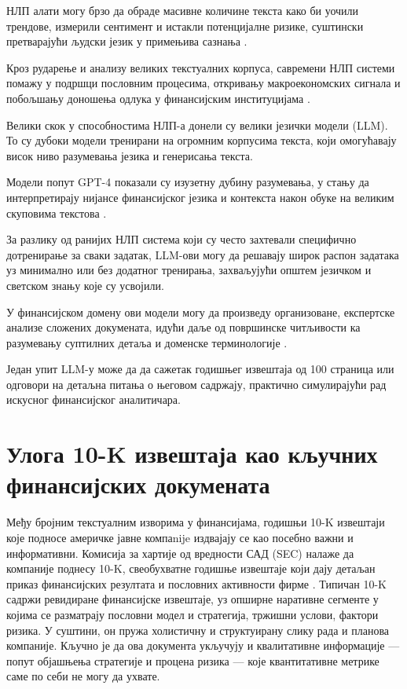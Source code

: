 НЛП алати могу брзо да обраде масивне количине текста како би уочили трендове, измерили сентимент и истакли потенцијалне ризике, суштински претварајући људски језик у примењива сазнања \cite{paro_ai_strategic_2023}. 

Кроз рударење и анализу великих текстуалних корпуса, савремени НЛП системи помажу у подршци пословним процесима, откривању макроекономских сигнала и побољшању доношења одлука у финансијским институцијама \cite{yang_evaluating_2025}.

Велики скок у способностима НЛП-а донели су велики језички модели (LLM). То су дубоки модели тренирани на огромним корпусима текста, који омогућавају висок ниво разумевања језика и генерисања текста. 

Модели попут GPT-4 показали су изузетну дубину разумевања, у стању да интерпретирају нијансе финансијског језика и контекста након обуке на великим скуповима текстова \cite{paro_ai_strategic_2023}. 

За разлику од ранијих НЛП система који су често захтевали специфично дотренирање за сваки задатак, LLM-ови могу да решавају широк распон задатака уз минимално или без додатног тренирања, захваљујући општем језичком и светском знању које су усвојили. 

У финансијском домену ови модели могу да произведу организоване, експертске анализе сложених докумената, идући даље од површинске читљивости ка разумевању суптилних детаља и доменске терминологије \cite{yang_evaluating_2025}. 

Један упит LLM-у може да да сажетак годишњег извештаја од 100 страница или одговори на детаљна питања о његовом садржају, практично симулирајући рад искусног финансијског аналитичара.

\section{Улога 10-K извештаја као кључних финансијских докумената}

Међу бројним текстуалним изворима у финансијама, годишњи 10-K извештаји које подносе америчке јавне компаnije издвајају се као посебно важни и информативни. Комисија за хартије од вредности САД (SEC) налаже да компаније поднесу 10-K, свеобухватне годишње извештаје који дају детаљан приказ финансијских резултата и пословних активности фирме \cite{yang_evaluating_2025}. Типичан 10-K садржи ревидиране финансијске извештаје, уз опширне наративне сегменте у којима се разматрају пословни модел и стратегија, тржишни услови, фактори ризика. У суштини, он пружа холистичну и структуирану слику рада и планова компаније. Кључно је да ова документа укључују и квалитативне информације — попут објашњења стратегије и процена ризика — које квантитативне метрике саме по себи не могу да ухвате.

